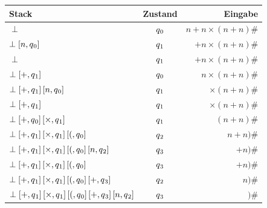\documentclass[
10pt,
pantone315, 	%
]{beamer}
\begin{document}
\begin{frame}
	\small
	\begin{tabular}{| l | c | r |}
	\hline
	Stack & Zustand & Eingabe \\ \hline
	$\perp$ & $q \textsubscript{0}$ & $ n+n \times (n+n)\#$ \\ \hline
	
	$ \perp\left[n, q\textsubscript{0} \right]$ & $q \textsubscript{1}$ & $+n \times (n+n)\#$ \\ \hline
	
	$\perp$ & $q \textsubscript{1}$ & $ +n \times (n+n)\#$ \\ \hline
	
	$\perp\left[+, q\textsubscript{1} \right]$ & $q \textsubscript{0}$ & $ n \times (n+n)\#$ \\ \hline
	
	$\perp\left[+, q\textsubscript{1} \right] \left[n, q\textsubscript{0} \right]$ 
	& $q \textsubscript{1}$ & $\times (n+n)\#$ \\ \hline
	
	$\perp\left[+, q\textsubscript{1} \right]$ & $q \textsubscript{1}$ & $\times (n+n)\#$ \\ \hline
	
	$\perp\left[+, q\textsubscript{0} \right]\left[\times, q\textsubscript{1} \right]$ 
	& $q \textsubscript{1}$ & $(n+n)\#$ \\ \hline
	
	$\perp\left[+, q\textsubscript{1} \right]\left[\times, q\textsubscript{1} \right] \left[(, q\textsubscript{0} \right]$ 
	& $q \textsubscript{2}$ & $n+n)\#$ \\ \hline
	
	$\perp\left[+, q\textsubscript{1} \right]\left[\times, q\textsubscript{1} \right] \left[(, q\textsubscript{0} \right] \left[n, q\textsubscript{2} \right]$ 
	& $q \textsubscript{3}$ & $+n)\#$ \\ \hline
	
	$\perp\left[+, q\textsubscript{1} \right]\left[\times, q\textsubscript{1} \right] \left[(, q\textsubscript{0} \right]$ 
	& $q \textsubscript{3}$ & $+n)\#$ \\ \hline
	
	$\perp\left[+, q\textsubscript{1} \right]\left[\times, q\textsubscript{1} \right] \left[(, q\textsubscript{0} \right] \left[+, q\textsubscript{3} \right]$ 
	& $q \textsubscript{2}$ & $n)\#$ \\ \hline
	
	$\perp\left[+, q\textsubscript{1} \right]\left[\times, q\textsubscript{1} \right] \left[(, q\textsubscript{0} \right] \left[+, q\textsubscript{3} \right] \left[n, q\textsubscript{2} \right]$ 
	& $q \textsubscript{3}$ & $)\#$ \\ \hline
	

\end{tabular}
\end{frame}
\end{document}

